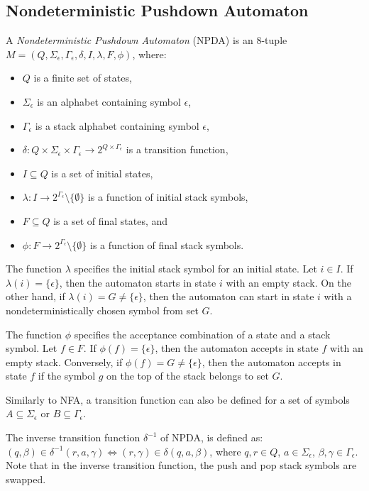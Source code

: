     \subsection{Nondeterministic Pushdown Automaton}
        A \textit{Nondeterministic Pushdown Automaton} (NPDA) is an 8-tuple $M = (Q, \Sigma_\epsilon, \Gamma_\epsilon, \delta, I, \lambda, F, \phi)$, where:
        \begin{itemize}
            \item $Q$ is a finite set of states,
            \item $\Sigma_\epsilon$ is an alphabet containing symbol $\epsilon$,
            \item $\Gamma_\epsilon$ is a stack alphabet containing symbol $\epsilon$,
            \item $\delta : Q \times \Sigma_\epsilon \times \Gamma_\epsilon \rightarrow 2^{Q \times \Gamma_\epsilon}$ is a transition function,
            \item $I \subseteq Q$ is a set of initial states,
            \item $\lambda: I \rightarrow 2^{\Gamma_\epsilon} \setminus \{\emptyset\}$ is a function of initial stack symbols,
            \item $F \subseteq Q$ is a set of final states, and
            \item $\phi: F \rightarrow 2^{\Gamma_\epsilon} \setminus \{\emptyset\}$ is a function of final stack symbols.
        \end{itemize}

        The function $\lambda$ specifies the initial stack symbol for an initial state. Let $i \in I$. If $\lambda(i) = \{\epsilon\}$, then the automaton starts in state $i$ with an empty stack. On the other hand, if $\lambda(i) = G \neq \{\epsilon\}$, then the automaton can start in state $i$ with a nondeterministically chosen symbol from set $G$.

        The function $\phi$ specifies the acceptance combination of a state and a stack symbol. Let $f \in F$. If $\phi(f) = \{\epsilon\}$, then the automaton accepts in state $f$ with an empty stack. Conversely, if $\phi(f) = G \neq \{\epsilon\}$, then the automaton accepts in state $f$ if the symbol $g$ on the top of the stack belongs to set $G$.

        Similarly to NFA, a transition function can also be defined for a set of symbols $A \subseteq \Sigma_\epsilon$ or $B \subseteq \Gamma_\epsilon$.

        The inverse transition function $\delta^{-1}$ of NPDA, is defined as: $(q, \beta) \in \delta^{-1}(r, a, \gamma) \iff (r, \gamma) \in \delta(q, a, \beta)$, where $q,r \in Q$, $a \in \Sigma_\epsilon$, $\beta, \gamma \in \Gamma_\epsilon$. Note that in the inverse transition function, the push and pop stack symbols are swapped.

